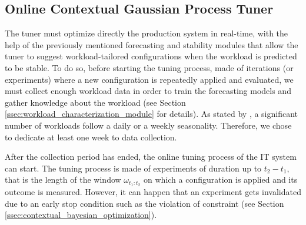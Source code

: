 \documentclass[a4paper, 12pt]{article} %
\begin{document}
	
	\subsection{Online Contextual Gaussian Process Tuner} \label{ssec:online_cgp_tuner}
	The tuner must optimize directly the production system in real-time, with the help of the previously mentioned forecasting and stability modules that allow the tuner to suggest workload-tailored configurations when the workload is predicted to be stable.
	To do so, before starting the tuning process, made of iterations (or experiments) where a new configuration is repeatedly applied and evaluated, we must collect enough workload data in order to train the forecasting models and gather knowledge about the workload (see Section \ref{ssec:workload_characterization_module} for details).
	As stated by \cite{Seagull}, a significant number of workloads follow a daily or a weekly seasonality. Therefore, we chose to dedicate at least one week to data collection.
	 
	 After the collection period has ended, the online tuning process of the IT system can start. The tuning process is made of experiments of duration up to $t_2 - t_1$, that is the length of the window $\omega_{t_1:t_2}$ on which a configuration is applied and its outcome is measured.  However, it can happen that an experiment gets invalidated due to an early stop condition such as the violation of constraint (see Section \ref{ssec:contextual_bayesian_optimization}).  
	 
\end{document}
